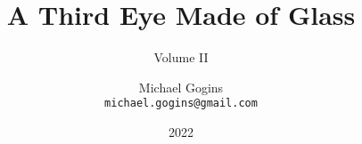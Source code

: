 

\title{A Third Eye Made of Glass}
\subtitle{Volume II}
\author{Michael Gogins \\ \texttt{michael.gogins@gmail.com}}
\date{2022 }
\publishers{Irreducible Productions, New York}

\maketitle
	




